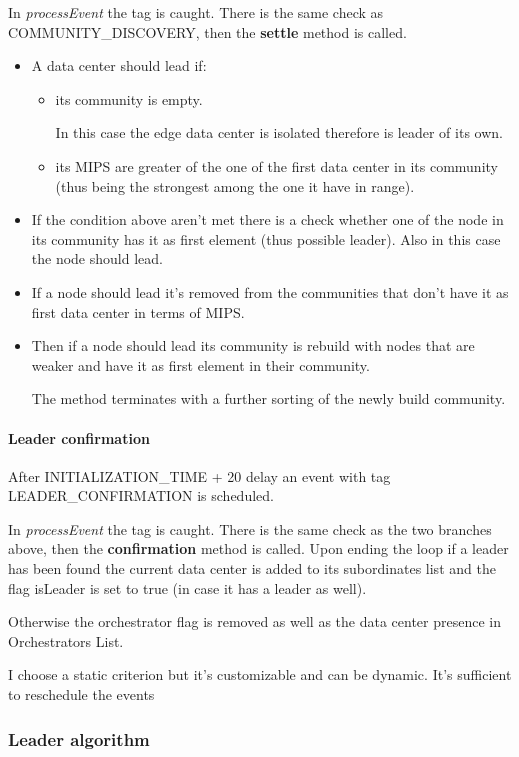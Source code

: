 \documentclass[12pt]{report}
\begin{document}
In \textit{processEvent} the tag is caught.
There is the same check as COMMUNITY\_DISCOVERY, then the \textbf{settle} method is called.
\begin{itemize}
	\item A data center should lead if:
	\begin{itemize}
		\item its community is empty.	
	
		In this case the edge data center is isolated therefore is leader of its own.
		\item its MIPS are greater of the one of the first data center in its community (thus being the strongest among the one it have in range).
	\end{itemize}
 	\item If the condition above aren't met there is a check whether one of the node in its community has it as first element (thus possible leader). Also in this case the node should lead.
 	\item If a node should lead it's removed from the communities that don't have it as first data center in terms of MIPS.
 	\item Then if a node should lead its community is rebuild with nodes that are weaker and have it as first element in their community.
 	
 	The method terminates with a further sorting of the newly build community.
\end{itemize}
 		
\paragraph*{Leader confirmation}After INITIALIZATION\_TIME + 20 delay an event with tag LEADER\_CONFIRMATION is scheduled.

In \textit{processEvent} the tag is caught.
There is the same check as the two branches above, then the \textbf{confirmation} method is called.
Upon ending the loop if a leader has been found the current data center is added to its subordinates list and the flag isLeader is set to true (in case it has a leader as well).
 		
Otherwise the orchestrator flag is removed as well as the data center presence in Orchestrators List.

  	I choose a static criterion but it's customizable and can be dynamic. It's sufficient to reschedule the events %
\subsubsection*{Leader algorithm}
\end{document}

